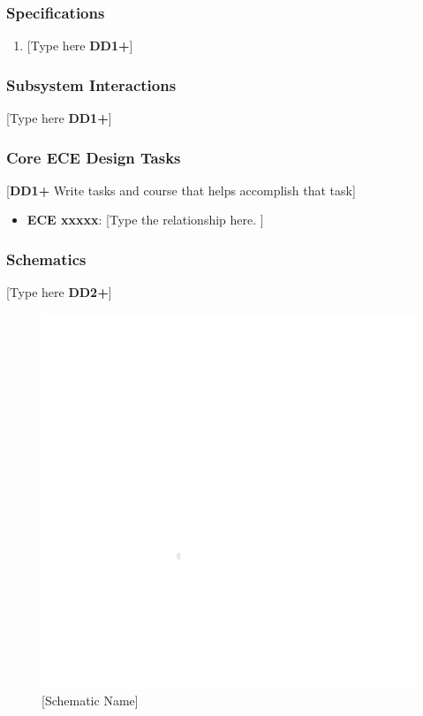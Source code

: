 \documentclass[letterpaper, 11pt]{article}
\begin{document}
\subsubsection{Specifications}
\begin{enumerate}
    \item {[Type here \textbf{DD1+}]}
\end{enumerate}

\subsubsection{Subsystem Interactions}
[Type here \textbf{DD1+}]

\subsubsection{Core ECE Design Tasks}
[\textbf{DD1+} Write tasks and course that helps accomplish that task]
\begin{itemize}
    \item \textbf{ECE xxxxx}: [Type the relationship here. ]
\end{itemize}

\subsubsection{Schematics}
[Type here \textbf{DD2+}]
\begin{figure}[h]
    \centering
    \includegraphics[width=16cm]{white.png} %
    \caption{[Schematic Name]}
\end{figure} %
\end{document}
